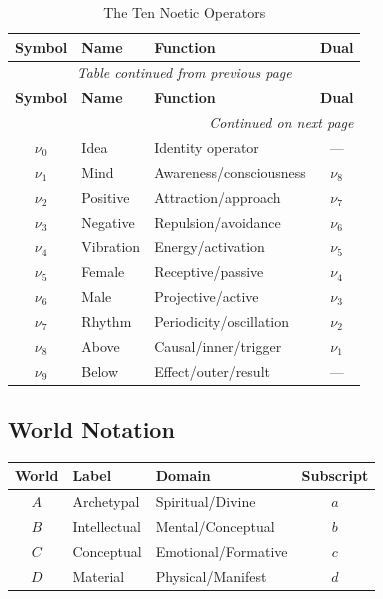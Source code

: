 \documentclass[11pt,twoside]{book}
\newcommand{\noe}[1]{\nu_{#1}}
\begin{document}
\begin{center}
\small
\begin{longtable}{c|l|p{5cm}|c}
\caption{The Ten Noetic Operators} \\
\toprule
\textbf{Symbol} & \textbf{Name} & \textbf{Function} & \textbf{Dual} \\
\midrule
\endfirsthead
\multicolumn{4}{c}{\textit{Table continued from previous page}} \\
\toprule
\textbf{Symbol} & \textbf{Name} & \textbf{Function} & \textbf{Dual} \\
\midrule
\endhead
\midrule
\multicolumn{4}{r}{\textit{Continued on next page}} \\
\endfoot
\bottomrule
\endlastfoot
$\noe{0}$ & Idea & Identity operator & --- \\
$\noe{1}$ & Mind & Awareness/consciousness & $\noe{8}$ \\
$\noe{2}$ & Positive & Attraction/approach & $\noe{7}$ \\
$\noe{3}$ & Negative & Repulsion/avoidance & $\noe{6}$ \\
$\noe{4}$ & Vibration & Energy/activation & $\noe{5}$ \\
$\noe{5}$ & Female & Receptive/passive & $\noe{4}$ \\
$\noe{6}$ & Male & Projective/active & $\noe{3}$ \\
$\noe{7}$ & Rhythm & Periodicity/oscillation & $\noe{2}$ \\
$\noe{8}$ & Above & Causal/inner/trigger & $\noe{1}$ \\
$\noe{9}$ & Below & Effect/outer/result & --- \\
\end{longtable}
\end{center}

\subsection{World Notation}

\begin{center}
\begin{tabular}{c|l|l|c}
\toprule
\textbf{World} & \textbf{Label} & \textbf{Domain} & \textbf{Subscript} \\
\midrule
$A$ & Archetypal & Spiritual/Divine & $a$ \\
$B$ & Intellectual & Mental/Conceptual & $b$ \\
$C$ & Conceptual & Emotional/Formative & $c$ \\
$D$ & Material & Physical/Manifest & $d$ \\
\bottomrule
\end{tabular}
\end{center}
\end{document}
